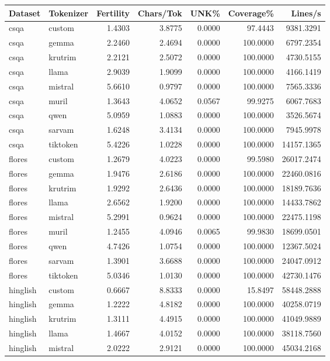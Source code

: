 \begin{tabular}{llrrrrr}
\toprule
Dataset & Tokenizer & Fertility & Chars/Tok & UNK\% & Coverage\% & Lines/s \\
\midrule
csqa & custom & 1.4303 & 3.8775 & 0.0000 & 97.4443 & 9381.3291 \\
csqa & gemma & 2.2460 & 2.4694 & 0.0000 & 100.0000 & 6797.2354 \\
csqa & krutrim & 2.2121 & 2.5072 & 0.0000 & 100.0000 & 4730.5155 \\
csqa & llama & 2.9039 & 1.9099 & 0.0000 & 100.0000 & 4166.1419 \\
csqa & mistral & 5.6610 & 0.9797 & 0.0000 & 100.0000 & 7565.3336 \\
csqa & muril & 1.3643 & 4.0652 & 0.0567 & 99.9275 & 6067.7683 \\
csqa & qwen & 5.0959 & 1.0883 & 0.0000 & 100.0000 & 3526.5674 \\
csqa & sarvam & 1.6248 & 3.4134 & 0.0000 & 100.0000 & 7945.9978 \\
csqa & tiktoken & 5.4226 & 1.0228 & 0.0000 & 100.0000 & 14157.1365 \\
flores & custom & 1.2679 & 4.0223 & 0.0000 & 99.5980 & 26017.2474 \\
flores & gemma & 1.9476 & 2.6186 & 0.0000 & 100.0000 & 22460.0816 \\
flores & krutrim & 1.9292 & 2.6436 & 0.0000 & 100.0000 & 18189.7636 \\
flores & llama & 2.6562 & 1.9200 & 0.0000 & 100.0000 & 14433.7862 \\
flores & mistral & 5.2991 & 0.9624 & 0.0000 & 100.0000 & 22475.1198 \\
flores & muril & 1.2455 & 4.0946 & 0.0065 & 99.9830 & 18699.0501 \\
flores & qwen & 4.7426 & 1.0754 & 0.0000 & 100.0000 & 12367.5024 \\
flores & sarvam & 1.3901 & 3.6688 & 0.0000 & 100.0000 & 24047.0912 \\
flores & tiktoken & 5.0346 & 1.0130 & 0.0000 & 100.0000 & 42730.1476 \\
hinglish & custom & 0.6667 & 8.8333 & 0.0000 & 15.8497 & 58448.2888 \\
hinglish & gemma & 1.2222 & 4.8182 & 0.0000 & 100.0000 & 40258.0719 \\
hinglish & krutrim & 1.3111 & 4.4915 & 0.0000 & 100.0000 & 41049.9889 \\
hinglish & llama & 1.4667 & 4.0152 & 0.0000 & 100.0000 & 38118.7560 \\
hinglish & mistral & 2.0222 & 2.9121 & 0.0000 & 100.0000 & 45034.2168 \\

\end{tabular}
